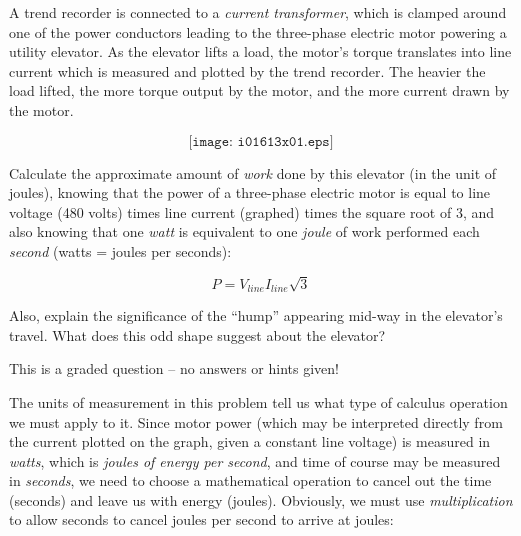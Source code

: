 

A trend recorder is connected to a {\it current transformer}, which is clamped around one of the power conductors leading to the three-phase electric motor powering a utility elevator.  As the elevator lifts a load, the motor's torque translates into line current which is measured and plotted by the trend recorder.  The heavier the load lifted, the more torque output by the motor, and the more current drawn by the motor.

$$\texttt{[image: i01613x01.eps]}$$

Calculate the approximate amount of {\it work} done by this elevator (in the unit of joules), knowing that the power of a three-phase electric motor is equal to line voltage (480 volts) times line current (graphed) times the square root of 3, and also knowing that one {\it watt} is equivalent to one {\it joule} of work performed each {\it second} (watts = joules per seconds):

$$P = V_{line} I_{line} \sqrt{3}$$

Also, explain the significance of the ``hump'' appearing mid-way in the elevator's travel.  What does this odd shape suggest about the elevator?

\vfil 

\eject






This is a graded question -- no answers or hints given!







The units of measurement in this problem tell us what type of calculus operation we must apply to it.  Since motor power (which may be interpreted directly from the current plotted on the graph, given a constant line voltage) is measured in {\it watts}, which is {\it joules of energy per second}, and time of course may be measured in {\it seconds}, we need to choose a mathematical operation to cancel out the time (seconds) and leave us with energy (joules).  Obviously, we must use {\it multiplication} to allow seconds to cancel joules per second to arrive at joules:

